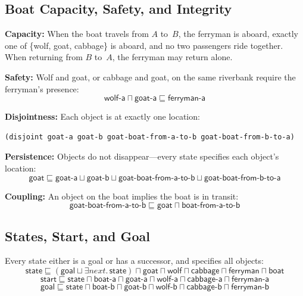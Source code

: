\documentclass[11pt,a4paper]{article}
\newcommand{\DLsome}[2]{\exists #1.\,#2}
\newcommand{\DLand}{\sqcap}
\newcommand{\DLor}{\sqcup}
\newcommand{\DLsub}{\sqsubseteq}
\newcommand{\concept}[1]{\ensuremath{\mathsf{#1}}}
\newcommand{\role}[1]{\ensuremath{\mathit{#1}}}
\begin{document}
\subsection{Boat Capacity, Safety, and Integrity}

\textbf{Capacity:} When the boat travels from $A$ to~$B$, the ferryman
is aboard, exactly one of \{wolf, goat, cabbage\} is aboard, and no two
passengers ride together.  When returning from $B$ to~$A$, the ferryman
may return alone.

\textbf{Safety:} Wolf and goat, or cabbage and goat, on the same
riverbank require the ferryman's presence:
\[
\concept{wolf\text{-}a} \DLand \concept{goat\text{-}a} \DLsub \concept{ferryman\text{-}a}
\]

\textbf{Disjointness:} Each object is at exactly one location:
\begin{lstlisting}[style=racer]
(disjoint goat-a goat-b goat-boat-from-a-to-b goat-boat-from-b-to-a)
\end{lstlisting}

\textbf{Persistence:} Objects do not disappear---every state specifies
each object's location:
\[
\concept{goat} \DLsub
  \concept{goat\text{-}a} \DLor \concept{goat\text{-}b} \DLor
  \concept{goat\text{-}boat\text{-}from\text{-}a\text{-}to\text{-}b} \DLor
  \concept{goat\text{-}boat\text{-}from\text{-}b\text{-}to\text{-}a}
\]

\textbf{Coupling:} An object on the boat implies the boat is in transit:
\[
\concept{goat\text{-}boat\text{-}from\text{-}a\text{-}to\text{-}b} \DLsub
  \concept{goat} \DLand \concept{boat\text{-}from\text{-}a\text{-}to\text{-}b}
\]

\subsection{States, Start, and Goal}

Every state either is a goal or has a successor, and specifies all objects:
\[
\concept{state} \DLsub
  (\concept{goal} \DLor \DLsome{\role{next}}{\concept{state}}) \DLand
  \concept{goat} \DLand \concept{wolf} \DLand \concept{cabbage} \DLand
  \concept{ferryman} \DLand \concept{boat}
\]
\[
\concept{start} \DLsub \concept{state} \DLand \concept{boat\text{-}a} \DLand
  \concept{goat\text{-}a} \DLand \concept{wolf\text{-}a} \DLand
  \concept{cabbage\text{-}a} \DLand \concept{ferryman\text{-}a}
\]
\[
\concept{goal} \DLsub \concept{state} \DLand \concept{boat\text{-}b} \DLand
  \concept{goat\text{-}b} \DLand \concept{wolf\text{-}b} \DLand
  \concept{cabbage\text{-}b} \DLand \concept{ferryman\text{-}b}
\]
\end{document}
